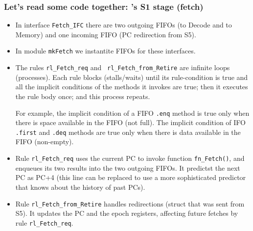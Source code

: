\begin{frame}[fragile]
\frametitle{Let's read some code together: {\FIFE}'s S1 stage (fetch)}

\begin{center}\scriptsize

 \vspace*{5ex}
 
 \begin{minipage}{0.9\textwidth}
  \begin{itemize}

   \item In interface {\tt Fetch\_IFC} there are two outgoing FIFOs
     (to Decode and to Memory) and one incoming FIFO (PC redirection
     from S5).

   \item In module {\tt mkFetch} we instantite FIFOs for these interfaces.

   \item The rules {\tt rl\_Fetch\_req} and {\tt
     rl\_Fetch\_from\_Retire} are infinite loops (processes).  Each
     rule blocks (stalls/waits) until its rule-condition is true and
     all the implicit conditions of the methods it invokes are true;
     then it executes the rule body once; and this process repeats.

     For example, the implicit condition of a FIFO {\tt .enq} method
     is true only when there is space available in the FIFO (not
     full).  The implicit condition of IFO {\tt .first} and {\tt .deq}
     methods are true only when there is data available in the FIFO
     (non-empty).

   \item Rule {\tt rl\_Fetch\_req} uses the current PC to invoke
     function {\tt fn\_Fetch()}, and enqueues its two results into the
     two outgoing FIFOs.  It predictst the next PC as PC+4 (this line
     can be replaced to use a more sophisticated predictor that knows
     about the history of past PCs).

   \item Rule {\tt rl\_Fetch\_from\_Retire} handles redirections
     (struct that was sent from S5). It updates the PC and the epoch
     registers, affecting future fetches by rule {\tt rl\_Fetch\_req}.

  \end{itemize}
 \end{minipage}
\end{center}

\end{frame}

